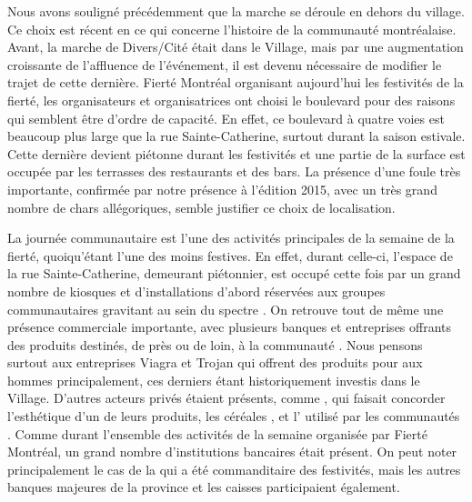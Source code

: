 Nous avons souligné précédemment que la marche se déroule en dehors du village.
Ce choix est récent en ce qui concerne l'histoire de la communauté \lgbt montréalaise.
Avant, la marche de Divers/Cité était dans le Village, mais par une augmentation croissante de l'affluence de l'événement, il est devenu nécessaire de modifier le trajet de cette dernière.
Fierté Montréal organisant aujourd'hui les festivités de la fierté, les organisateurs et organisatrices ont choisi le boulevard pour des raisons qui semblent être d'ordre de capacité.
En effet, ce boulevard à quatre voies est beaucoup plus large que la rue Sainte-Catherine, surtout durant la saison estivale.
Cette dernière devient piétonne durant les festivités et une partie de la surface est occupée par les terrasses des restaurants et des bars.
La présence d'une foule très importante, confirmée par notre présence à l'édition 2015, avec un très grand nombre de chars allégoriques, semble justifier ce choix de localisation.

La journée communautaire est l'une des activités principales de la semaine de la fierté, quoiqu’étant l'une des moins festives.
En effet, durant celle-ci, l'espace de la rue Sainte-Catherine, demeurant piétonnier, est occupé cette fois par un grand nombre de kiosques et d'installations d'abord réservées aux groupes communautaires gravitant au sein du spectre \lgbt.
On retrouve tout de même une présence commerciale importante, avec plusieurs banques et entreprises offrants des produits destinés, de près ou de loin, à la communauté \lgbt.
Nous pensons surtout aux entreprises Viagra et Trojan qui offrent des produits pour aux hommes principalement, ces derniers étant historiquement investis dans le Village.
D'autres acteurs privés étaient présents, comme , qui faisait concorder l'esthétique d'un de leurs produits, les céréales , et l' utilisé par les communautés \lgbt.
Comme durant l'ensemble des activités de la semaine organisée par Fierté Montréal, un grand nombre d'institutions bancaires était présent.
On peut noter principalement le cas de la  qui a été commanditaire des festivités, mais les autres banques majeures de la province et les caisses  participaient également.

